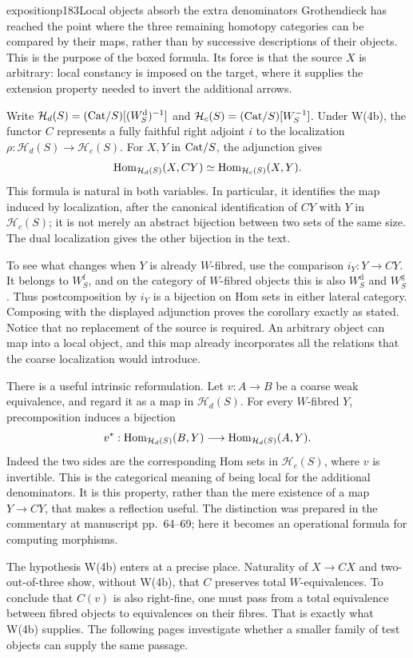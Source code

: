 \begin{dcomment}{exposition}{p183}{Local objects absorb the extra denominators}
Grothendieck has reached the point where the three remaining homotopy categories can be compared by their maps, rather than by successive descriptions of their objects. This is the purpose of the boxed formula. Its force is that the source $X$ is arbitrary: local constancy is imposed on the target, where it supplies the extension property needed to invert the additional arrows.

Write $\mathcal H_d(S)=(\mathrm{Cat}/S)[(W_S^{\mathrm d})^{-1}]$ and $\mathcal H_c(S)=(\mathrm{Cat}/S)[W_S^{-1}]$. Under W(4b), the functor $C$ represents a fully faithful right adjoint $i$ to the localization $\rho:\mathcal H_d(S)\to\mathcal H_c(S)$. For $X,Y$ in $\mathrm{Cat}/S$, the adjunction gives
\[
 \mathrm{Hom}_{\mathcal H_d(S)}(X,CY)
 \simeq \mathrm{Hom}_{\mathcal H_c(S)}(X,Y).
\]
This formula is natural in both variables. In particular, it identifies the map induced by localization, after the canonical identification of $CY$ with $Y$ in $\mathcal H_c(S)$; it is not merely an abstract bijection between two sets of the same size. The dual localization gives the other bijection in the text.

To see what changes when $Y$ is already $W$-fibred, use the comparison $i_Y:Y\to CY$. It belongs to $W_S^{\mathrm f}$, and on the category of $W$-fibred objects this is also $W_S^{\mathrm d}$ and $W_S^{\mathrm g}$. Thus postcomposition by $i_Y$ is a bijection on Hom sets in either lateral category. Composing with the displayed adjunction proves the corollary exactly as stated. Notice that no replacement of the source is required. An arbitrary object can map into a local object, and this map already incorporates all the relations that the coarse localization would introduce.

There is a useful intrinsic reformulation. Let $v:A\to B$ be a coarse weak equivalence, and regard it as a map in $\mathcal H_d(S)$. For every $W$-fibred $Y$, precomposition induces a bijection
\[
 v^*:\mathrm{Hom}_{\mathcal H_d(S)}(B,Y)
       \longrightarrow \mathrm{Hom}_{\mathcal H_d(S)}(A,Y).
\]
Indeed the two sides are the corresponding Hom sets in $\mathcal H_c(S)$, where $v$ is invertible. This is the categorical meaning of being local for the additional denominators. It is this property, rather than the mere existence of a map $Y\to CY$, that makes a reflection useful. The distinction was prepared in the commentary at manuscript pp.~64--69; here it becomes an operational formula for computing morphisms.

The hypothesis W(4b) enters at a precise place. Naturality of $X\to CX$ and two-out-of-three show, without W(4b), that $C$ preserves total $W$-equivalences. To conclude that $C(v)$ is also right-fine, one must pass from a total equivalence between fibred objects to equivalences on their fibres. That is exactly what W(4b) supplies. The following pages investigate whether a smaller family of test objects can supply the same passage.
\end{dcomment}


